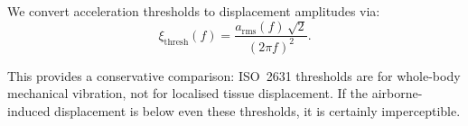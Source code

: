 We convert acceleration thresholds to displacement amplitudes via:
%
\begin{equation}
  \xi_\mathrm{thresh}(f) = \frac{a_\mathrm{rms}(f)\,\sqrt{2}}{(2\pi f)^2}.
  \label{eq:perception-disp}
\end{equation}

This provides a conservative comparison: ISO~2631 thresholds are for
whole-body mechanical vibration, not for localised tissue displacement.
If the airborne-induced displacement is below even these thresholds, it
is certainly imperceptible.